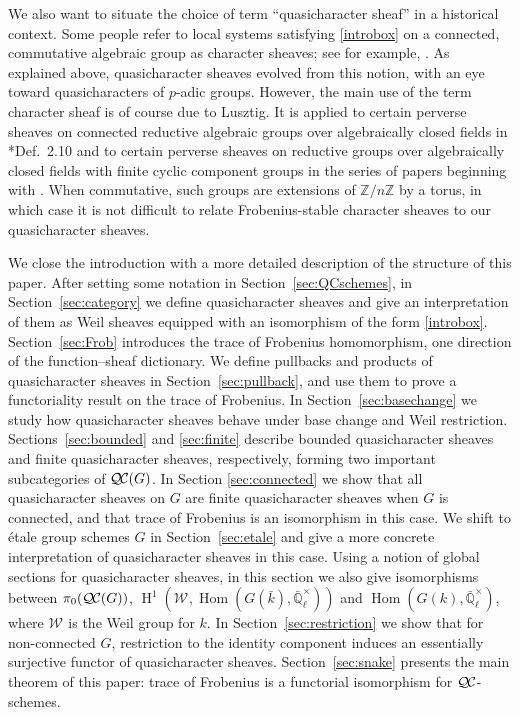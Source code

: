 \documentclass{amsart}
\theoremstyle{plain}
\theoremstyle{definition}
\theoremstyle{remark}
\newcommand{\ZZ}{{\mathbb{Z}}}
\newcommand{\EE}{\mathbb{\bar Q}_\ell}
\newcommand{\bFq}{\bar{k}}
\newcommand{\Fq}{k}
\newcommand{\EEx}{\EE^\times}
\newcommand{\Weil}[1]{\mathcal{W}_{#1}}
\DeclareMathOperator{\Hom}{Hom}
\DeclareMathOperator{\Hh}{H}
\newcommand{\QC}{{\mathcal{Q\hskip-0.8pt C}}}
\newcommand{\QCiso}[1]{\pi_0 (\QC(#1))}
\begin{document}
We also want to situate the choice of term ``quasicharacter sheaf'' in a historical context.
Some people refer to local systems satisfying \eqref{introbox} on a connected, commutative algebraic group as character sheaves; 
see for example, \cite{kamgarpour:09a}. 
As explained above, quasicharacter sheaves evolved from this notion,
with an eye toward quasicharacters of $p$-adic groups.
However, the main use of the term character sheaf is of course due to Lusztig. 
It is applied to certain perverse sheaves on connected reductive algebraic groups over algebraically closed fields in
\cite{lusztig:85a}*{Def.~2.10} and to certain perverse sheaves on reductive groups
over algebraically closed fields with finite cyclic component groups in the series of papers
beginning with \cite{lusztig:disconnected1}.  
When commutative, such groups are extensions of $\ZZ/n\ZZ$ by a torus,
in which case it is not difficult to relate Frobenius-stable character sheaves to our quasicharacter sheaves.

We close the introduction with a more detailed description of the structure of this paper.
After setting some notation in Section~\ref{sec:QCschemes}, in Section~\ref{sec:category} we define quasicharacter sheaves and give an interpretation of
them as Weil sheaves equipped with an isomorphism of the form  \eqref{introbox}.
Section~\ref{sec:Frob} introduces the trace of Frobenius homomorphism,
one direction of the function--sheaf dictionary.
We define pullbacks and products of quasicharacter sheaves in Section~\ref{sec:pullback}, and use
them to prove a functoriality result on the trace of Frobenius.
In Section~\ref{sec:basechange} we study how quasicharacter sheaves behave under base change
and Weil restriction.
Sections~\ref{sec:bounded} and \ref{sec:finite} describe bounded quasicharacter sheaves and finite quasicharacter sheaves, respectively,
forming two important subcategories of $\QC(G)$.  
In Section \ref{sec:connected} we show that all quasicharacter sheaves on $G$ are finite quasicharacter sheaves when $G$ is connected, and that trace of Frobenius is an isomorphism in this case.
We shift to \'etale group schemes $G$ in Section~\ref{sec:etale} and give a more concrete interpretation
of quasicharacter sheaves in this case.  Using a notion of global sections for quasicharacter sheaves, in this section 
we also give isomorphisms between $\QCiso{G}$, $\Hh^1(\Weil{}, \Hom(G(\bFq), \EEx))$ and $\Hom(G(\Fq), \EEx)$, where $\Weil{}$ is the Weil group for $\Fq$.
In Section~\ref{sec:restriction} we show that for non-connected $G$, restriction to the identity component
induces an essentially surjective functor of quasicharacter sheaves.
Section~\ref{sec:snake} presents the main theorem of this paper: trace of Frobenius
is a functorial isomorphism for $\QC$-schemes.
\end{document}
